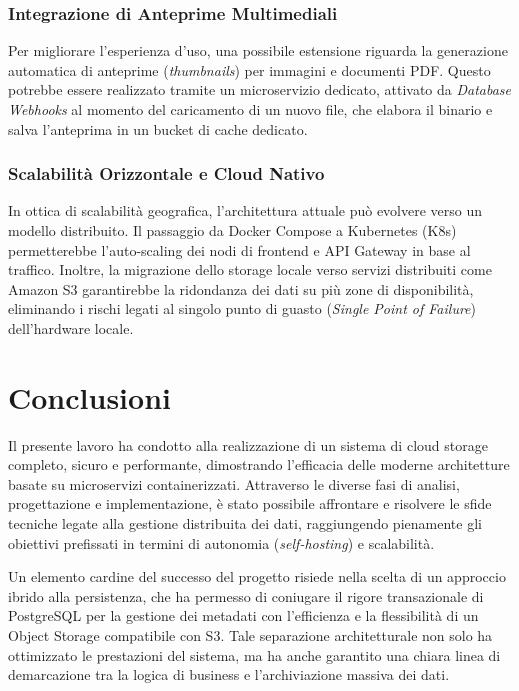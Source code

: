 \documentclass[12pt,a4paper]{report}
\begin{document}
\subsection{Integrazione di Anteprime Multimediali}
Per migliorare l'esperienza d'uso, una possibile estensione riguarda la
generazione automatica di anteprime (\textit{thumbnails}) per immagini e
documenti PDF. Questo potrebbe essere realizzato tramite un microservizio
dedicato, attivato da \textit{Database Webhooks} al momento del caricamento di
un nuovo file, che elabora il binario e salva l'anteprima in un bucket di cache
dedicato.

\subsection{Scalabilità Orizzontale e Cloud Nativo}
In ottica di scalabilità geografica, l'architettura attuale può evolvere verso
un modello distribuito. Il passaggio da Docker Compose a Kubernetes (K8s)
permetterebbe l'auto-scaling dei nodi di frontend e API Gateway in base al
traffico. Inoltre, la migrazione dello storage locale verso servizi distribuiti
come Amazon S3 garantirebbe la ridondanza dei dati su più zone di
disponibilità, eliminando i rischi legati al singolo punto di guasto
(\textit{Single Point of Failure}) dell'hardware locale.

\chapter*{Conclusioni}
Il presente lavoro ha condotto alla realizzazione di un sistema di
cloud storage completo, sicuro e performante, dimostrando l'efficacia
delle moderne architetture basate su microservizi containerizzati.
Attraverso le diverse fasi di analisi, progettazione e
implementazione, è stato possibile affrontare e risolvere le sfide
tecniche legate alla gestione distribuita dei dati, raggiungendo
pienamente gli obiettivi prefissati in termini di autonomia
(\textit{self-hosting}) e scalabilità.

Un elemento cardine del successo del progetto risiede nella scelta di
un approccio ibrido alla persistenza, che ha permesso di coniugare il
rigore transazionale di PostgreSQL per la gestione dei metadati con
l'efficienza e la flessibilità di un Object Storage compatibile con
S3. Tale separazione architetturale non solo ha ottimizzato le
prestazioni del sistema, ma ha anche garantito una chiara linea di
demarcazione tra la logica di business e l'archiviazione massiva dei dati.
\end{document}
